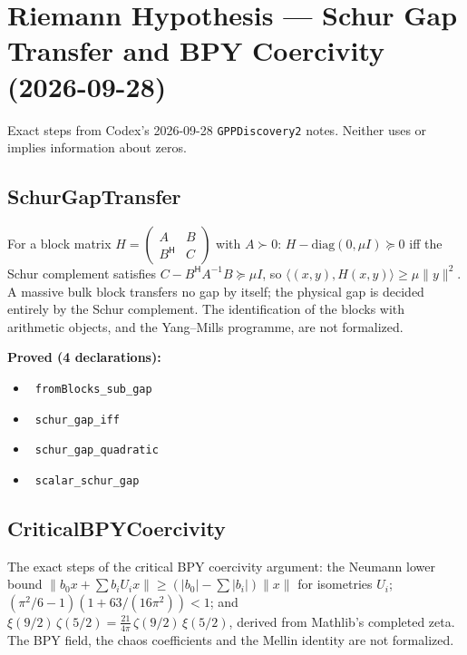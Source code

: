 \documentclass{report}
\theoremstyle{definition}
\begin{document}
\section{Riemann Hypothesis --- Schur Gap Transfer and BPY Coercivity (2026-09-28)}
Exact steps from Codex's 2026-09-28 \texttt{GPPDiscovery2} notes. Neither uses or implies information about zeros.

\subsection{SchurGapTransfer}
For a block matrix $H=\begin{pmatrix}A&B\\B^{\mathsf H}&C\end{pmatrix}$ with $A\succ0$: $H-\mathrm{diag}(0,\mu I)\succeq0$ iff the Schur complement satisfies $C-B^{\mathsf H}A^{-1}B\succeq\mu I$, so $\langle(x,y),H(x,y)\rangle\ge\mu\|y\|^2$. A massive bulk block transfers no gap by itself; the physical gap is decided entirely by the Schur complement. The identification of the blocks with arithmetic objects, and the Yang--Mills programme, are not formalized.

\noindent\textbf{Proved (4 declarations):}
\begin{itemize}
  \item {}\leanok\ \texttt{fromBlocks\_sub\_gap}
  \item {}\leanok\ \texttt{schur\_gap\_iff}
  \item {}\leanok\ \texttt{schur\_gap\_quadratic}
  \item {}\leanok\ \texttt{scalar\_schur\_gap}
\end{itemize}

\subsection{CriticalBPYCoercivity}
The exact steps of the critical BPY coercivity argument: the Neumann lower bound $\|b_0x+\sum b_iU_ix\|\ge(|b_0|-\sum|b_i|)\|x\|$ for isometries $U_i$; $(\pi^2/6-1)(1+63/(16\pi^2))<1$; and $\xi(9/2)\,\zeta(5/2)=\frac{21}{4\pi}\,\zeta(9/2)\,\xi(5/2)$, derived from Mathlib's completed zeta. The BPY field, the chaos coefficients and the Mellin identity are not formalized.
\end{document}
